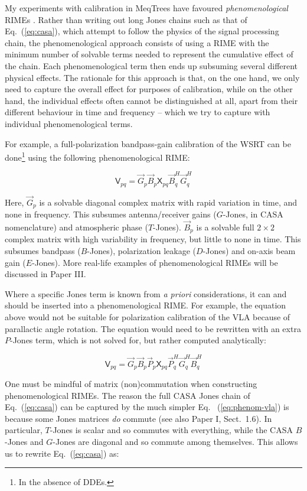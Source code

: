 \documentclass[referee]{aa}
\newcommand{\herm}{H}
\newcommand{\jones}[2]{\vec {#1}_{#2}}
\newcommand{\jonesT}[2]{\vec {#1}^{\herm}_{#2}}
\newcommand{\coh}[2]{\mathsf{{#1}}_{{#2}}}
\begin{document}
My experiments with calibration in MeqTrees have favoured \emph{phenomenological} RIMEs \citep{meqtrees}. Rather than writing out long Jones chains such as that of Eq.~(\ref{eq:casa}), which attempt to follow the physics of the signal processing chain, the phenomenological approach consists of using a RIME with the minimum number of solvable terms needed to represent the cumulative effect of the chain. Each phenomenological term then ends up subsuming several different physical effects. The rationale for this approach is that, on the one hand, we only need to capture the overall effect for purposes of calibration, while on the other hand, the individual effects often cannot be distinguished at all, apart from their different behaviour in time and frequency -- which we try to capture with individual phenomenological terms.

For example, a full-polarization bandpass-gain calibration of the WSRT can be done\footnote{In the absence of DDEs.} using the following phenomenological RIME:

\[
\coh{V}{pq} = \jones{G}{p} \jones{B}{p} \coh{X}{pq} \jonesT{B}{q} \jonesT{G}{q} 
\]

Here, $\jones{G}{p}$ is a solvable diagonal complex matrix with rapid variation in time, and none in frequency. This subsumes antenna/receiver gains ($G$-Jones, in CASA nomenclature) and atmospheric phase ($T$-Jones). $\jones{B}{p}$ is a solvable full $2\times2$ complex matrix with high variability in frequency, but little to none in time. This subsumes bandpass ($B$-Jones), polarization leakage ($D$-Jones) and on-axis beam gain ($E$-Jones). More real-life examples of phenomenological RIMEs will be discussed in Paper III.

Where a specific Jones term is known from \emph{a priori} considerations, it can and should be inserted into a phenomenological RIME. For example, the equation above would not be suitable for polarization calibration of the VLA because of parallactic angle rotation. The equation would need to be rewritten with an extra $P$-Jones term, which is not solved for, but rather computed analytically:

\begin{equation}\label{eq:phenom-vla}
\coh{V}{pq} = \jones{G}{p} \jones{B}{p} \jones{P}{p} \coh{X}{pq} \jonesT{P}{q} \jonesT{G}{q} \jonesT{B}{q} 
\end{equation}

One must be mindful of matrix (non)commutation when constructing phenomenological RIMEs. The reason the full CASA Jones chain of Eq.~(\ref{eq:casa}) can be captured by the much simpler Eq. ~(\ref{eq:phenom-vla}) is because some Jones matrices \emph{do} commute (see also Paper I, Sect.~1.6). In particular, $T$-Jones is scalar and so commutes with everything, while the CASA $B$-Jones and $G$-Jones are diagonal and so commute among themselves. This allows us to rewrite Eq.~(\ref{eq:casa}) as:
\end{document}
